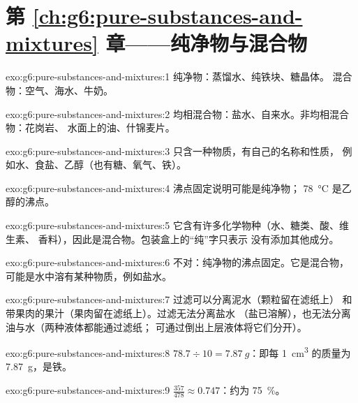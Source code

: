 \section*{第 \ref{ch:g6:pure-substances-and-mixtures} 章——纯净物与混合物}

\begin{solution}{exo:g6:pure-substances-and-mixtures:1}
纯净物：蒸馏水、纯铁块、糖晶体。
混合物：空气、海水、牛奶。
\end{solution}

\begin{solution}{exo:g6:pure-substances-and-mixtures:2}
均相混合物：盐水、自来水。非均相混合物：花岗岩、
水面上的油、什锦麦片。
\end{solution}

\begin{solution}{exo:g6:pure-substances-and-mixtures:3}
只含一种物质，有自己的名称和性质，
例如水、食盐、乙醇（也有糖、氧气、铁）。
\end{solution}

\begin{solution}{exo:g6:pure-substances-and-mixtures:4}
沸点固定说明可能是纯净物；
\qty{78}{\celsius} 是乙醇的沸点。
\end{solution}

\begin{solution}{exo:g6:pure-substances-and-mixtures:5}
它含有许多化学物种（水、糖类、酸、维生素、
香料），因此是混合物。包装盒上的“纯”字只表示
没有添加其他成分。
\end{solution}

\begin{solution}{exo:g6:pure-substances-and-mixtures:6}
不对：纯净物的沸点固定。它是混合物，
可能是水中溶有某种物质，例如盐水。
\end{solution}

\begin{solution}{exo:g6:pure-substances-and-mixtures:7}
过滤可以分离泥水（颗粒留在滤纸上）
和带果肉的果汁（果肉留在滤纸上）。过滤无法分离盐水
（盐已溶解），也无法分离油与水（两种液体都能通过滤纸；
可通过倒出上层液体将它们分开）。
\end{solution}

\begin{solution}{exo:g6:pure-substances-and-mixtures:8}
$78.7 \div 10 = \qty{7.87}{g}$：即每 \qty{1}{cm^3} 的质量为 \qty{7.87}{g}，是铁。
\end{solution}

\begin{solution}{exo:g6:pure-substances-and-mixtures:9}
$\frac{357}{478} \approx 0.747$：约为 \qty{75}{\percent}。
\end{solution}

